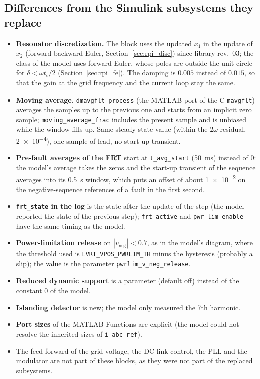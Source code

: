 \documentclass[11pt,a4paper]{scrartcl}
\newcommand{\ped}[1]{_{\mathrm{#1}}}
\newcommand{\code}[1]{\texttt{#1}}
\begin{document}
\begin{onehalfspace}
\section{Differences from the Simulink subsystems they replace}
\label{sec:differences}

\begin{itemize}[nosep]
	\item \textbf{Resonator discretization.} The block uses the updated $x_1$ in the update of $x_2$ (forward-backward Euler, Section~\ref{sec:rpi_disc}) since library rev.~03; the class of the model uses forward Euler, whose poles are outside the unit circle for $\delta < \omega t\ped{s}/2$ (Section~\ref{sec:rpi_fe}). The damping is $0.005$ instead of $0.015$, so that the gain at the grid frequency and the current loop stay the same.
	\item \textbf{Moving average.} \code{dmavgflt\_process} (the MATLAB port of the C \code{mavgflt}) averages the samples up to the previous one and starts from an implicit zero sample; \code{moving\_average\_frac} includes the present sample and is unbiased while the window fills up. Same steady-state value (within the $2\omega$ residual, \num{2e-4}), one sample of lead, no start-up transient.
	\item \textbf{Pre-fault averages of the FRT} start at \code{t\_avg\_start} (\SI{50}{\milli\second}) instead of 0: the model's average takes the zeros and the start-up transient of the sequence averages into its \SI{0.5}{\second} window, which puts an offset of about \num{1e-2} on the negative-sequence references of a fault in the first second.
	\item \textbf{\code{frt\_state} in the log} is the state after the update of the step (the model reported the state of the previous step); \code{frt\_active} and \code{pwr\_lim\_enable} have the same timing as the model.
	\item \textbf{Power-limitation release} on $|v\ped{neg}| < 0.7$, as in the model's diagram, where the threshold used is \code{LVRT\_VPOS\_PWRLIM\_TH} minus the hysteresis (probably a slip); the value is the parameter \code{pwrlim\_v\_neg\_release}.
	\item \textbf{Reduced dynamic support} is a parameter (default off) instead of the constant 0 of the model.
	\item \textbf{Islanding detector} is new; the model only measured the 7th harmonic.
	\item \textbf{Port sizes} of the MATLAB Functions are explicit (the model could not resolve the inherited sizes of \code{i\_abc\_ref}).
	\item The feed-forward of the grid voltage, the DC-link control, the PLL and the modulator are not part of these blocks, as they were not part of the replaced subsystems.
\end{itemize}


\end{onehalfspace}
\end{document}
